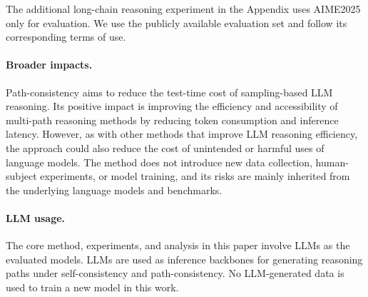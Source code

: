 \begin{table}[h]
\centering
\caption{Datasets used in the main experiments and their licenses or terms of use.}
\label{tab:dataset-licenses}
\end{table}

The additional long-chain reasoning experiment in the Appendix uses AIME2025 only for evaluation. We use the publicly available evaluation set and follow its corresponding terms of use.

\paragraph{Broader impacts.}
Path-consistency aims to reduce the test-time cost of sampling-based LLM reasoning. Its positive impact is improving the efficiency and accessibility of multi-path reasoning methods by reducing token consumption and inference latency. However, as with other methods that improve LLM reasoning efficiency, the approach could also reduce the cost of unintended or harmful uses of language models. The method does not introduce new data collection, human-subject experiments, or model training, and its risks are mainly inherited from the underlying language models and benchmarks.

\paragraph{LLM usage.}
The core method, experiments, and analysis in this paper involve LLMs as the evaluated models. LLMs are used as inference backbones for generating reasoning paths under self-consistency and path-consistency. No LLM-generated data is used to train a new model in this work.

